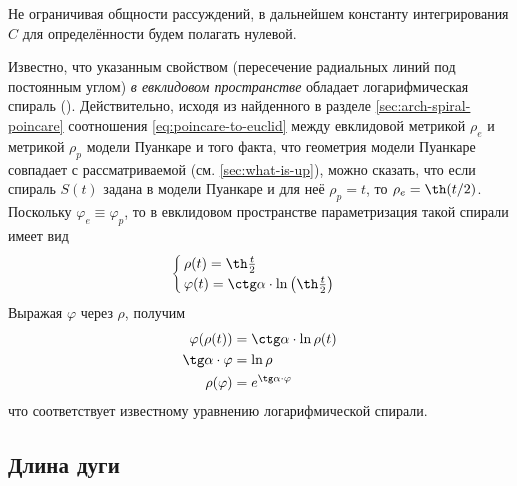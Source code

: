 \documentclass{article}
\numberwithin{equation}{section}
\renewcommand{\phi}{\varphi}
\begin{document}
Не ограничивая общности рассуждений, в дальнейшем константу
интегрирования $C$ для определённости будем полагать нулевой.

Известно, что указанным свойством (пересечение радиальных линий под
постоянным углом) \emph{в евклидовом пространстве} обладает
логарифмическая спираль (\cite{klein39}). Действительно, исходя из
найденного в разделе \ref{sec:arch-spiral-poincare} соотношения
\eqref{eq:poincare-to-euclid} между евклидовой метрикой $\rho_e$ и
метрикой $\rho_p$ модели Пуанкаре и того факта, что геометрия модели
Пуанкаре совпадает с рассматриваемой (см. \ref{sec:what-is-up}), можно
сказать, что если спираль $S(t)$ задана в модели Пуанкаре и для неё
$\rho_p = t$, то $\rho_e=\th(t/2)$. Поскольку $\phi_e \equiv \phi_p$,
то в евклидовом пространстве параметризация такой спирали имеет вид
\begin{equation*}
  \begin{cases}
    \rho(t) = \th\frac{t}{2} \\
    \phi(t) = \ctg\alpha \cdot \ln\left(\th\frac{t}{2}\right)
  \end{cases}
\end{equation*}
Выражая $\phi$ через $\rho$, получим
\begin{equation*}
  \begin{split}
    \phi(\rho(t)) &= \ctg\alpha \cdot \ln{\rho(t)} \\
    \tg\alpha \cdot \phi &= \ln\rho \\
    \rho(\phi) &= e^{\tg\alpha \cdot \phi}
  \end{split}
\end{equation*}
что соответствует известному уравнению логарифмической спирали.

\subsection{Длина дуги}
\end{document}
